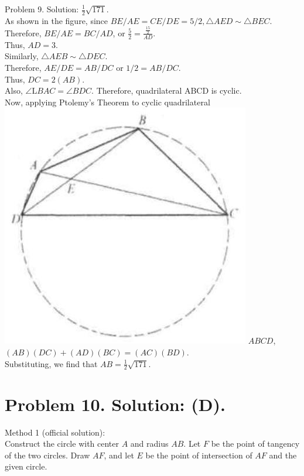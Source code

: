 \documentclass[10pt]{article}
\begin{document}
Problem 9. Solution: \(\frac{1}{2} \sqrt{171}\).\\
As shown in the figure, since \(B E / A E=C E / D E=5 / 2, \triangle A E D \sim \triangle B E C\). Therefore, \(B E / A E=B C / A D\), or \(\frac{5}{2}=\frac{\frac{15}{2}}{A D}\).\\
Thus, \(A D=3\).\\
Similarly, \(\triangle A E B \sim \triangle D E C\).\\
Therefore, \(A E / D E=A B / D C\) or \(1 / 2=A B / D C\).\\
Thus, \(D C=2(A B)\).\\
Also, \(\angle \mathrm{L} B A C=\angle B D C\). Therefore, quadrilateral ABCD is cyclic.\\
Now, applying Ptolemy's Theorem to cyclic quadrilateral\\
\includegraphics[max width=\textwidth]{2025_04_17_97bc1f7e44d93c271a88g-212(1)} \(A B C D\), \((A B)(D C)+(A D)(B C)=(A C)(B D)\).\\
Substituting, we find that \(A B=\frac{1}{2} \sqrt{171}\).

\section*{Problem 10. Solution: (D).}
Method 1 (official solution):\\
Construct the circle with center \(A\) and radius \(A B\). Let \(F\) be the point of tangency of the two circles. Draw \(A F\), and let \(E\) be the point of intersection of \(A F\) and the given circle.
\end{document}
